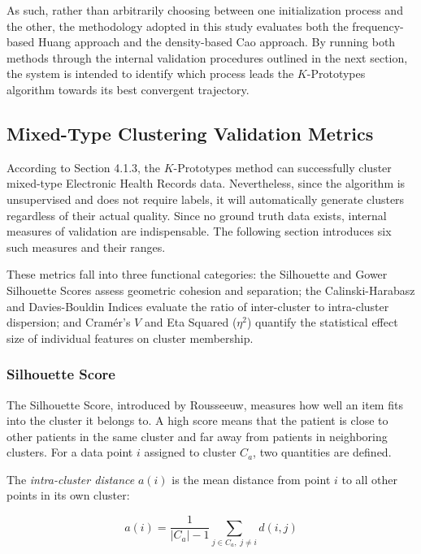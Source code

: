 As such, rather than arbitrarily choosing between one initialization process and the other, the methodology adopted in this study evaluates both the frequency-based Huang approach and the density-based Cao approach. By running both methods through the internal validation procedures outlined in the next section, the system is intended to identify which process leads the $K$-Prototypes algorithm towards its best convergent trajectory.
\subsection{Mixed-Type Clustering Validation Metrics}

According to Section 4.1.3, the $K$-Prototypes method can successfully cluster mixed-type Electronic Health Records data. Nevertheless, since the algorithm is unsupervised and does not require labels, it will automatically generate clusters regardless of their actual quality. Since no ground truth data exists, internal measures of validation are indispensable. The following section introduces six such measures and their ranges.

These metrics fall into three functional categories: the Silhouette and Gower Silhouette Scores assess geometric cohesion and separation; the Calinski-Harabasz and Davies-Bouldin Indices evaluate the ratio of inter-cluster to intra-cluster dispersion; and Cramér's $V$ and Eta Squared ($\eta^2$) quantify the statistical effect size of individual features on cluster membership.

\subsubsection*{Silhouette Score}

The Silhouette Score, introduced by Rousseeuw\cite{rousseeuw1987}, measures how well an item fits into the cluster it belongs to. A high score means that the patient is close to other patients in the same cluster and far away from patients in neighboring clusters. For a data point $i$ assigned to cluster $C_a$, two quantities are defined.

\vspace{1em}

The \emph{intra-cluster distance} $a(i)$ is the mean distance from point $i$ to all other points in its own cluster:

\begin{equation}
    a(i) = \frac{1}{|C_a| - 1} \sum_{j \in C_a,\; j \neq i} d(i, j)
    \label{eq:silhouette_a}
\end{equation}

